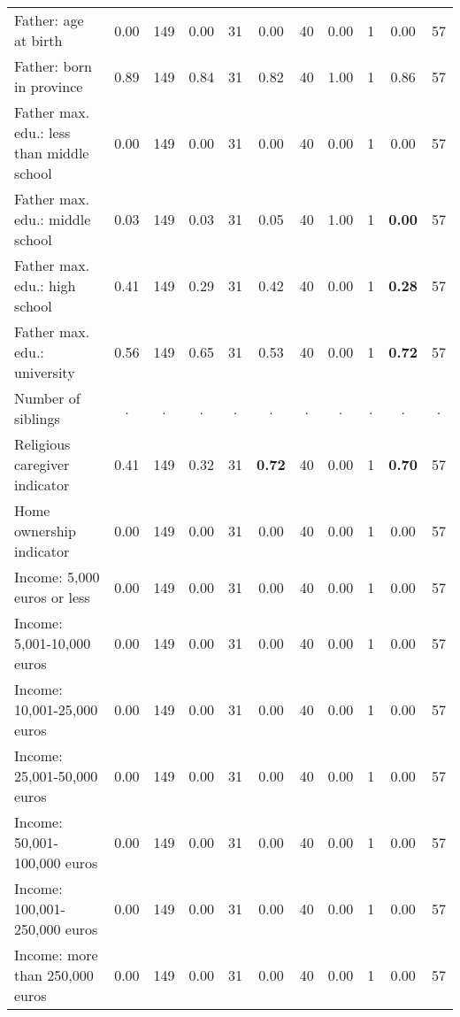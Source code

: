 \begin{tabular}{l c c c c c c c c c c}
Father: age at birth &      0.00 &       149 &      0.00 &        31 &      0.00 &        40 &      0.00 &         1 &      0.00 &        57 \\
Father: born in province &      0.89 &       149 &      0.84 &        31 &      0.82 &        40 &      1.00 &         1 &      0.86 &        57 \\
Father max. edu.: less than middle school &      0.00 &       149 &      0.00 &        31 &      0.00 &        40 &      0.00 &         1 &      0.00 &        57 \\
Father max. edu.: middle school &      0.03 &       149 &      0.03 &        31 &      0.05 &        40 &      1.00 &         1 & \textbf{     0.00} &        57 \\
Father max. edu.: high school &      0.41 &       149 &      0.29 &        31 &      0.42 &        40 &      0.00 &         1 & \textbf{     0.28} &        57 \\
Father max. edu.: university &      0.56 &       149 &      0.65 &        31 &      0.53 &        40 &      0.00 &         1 & \textbf{     0.72} &        57 \\
Number of siblings &         . & . &         . & . &         . & . &         . & . &         . & . \\
Religious caregiver indicator &      0.41 &       149 &      0.32 &        31 & \textbf{     0.72} &        40 &      0.00 &         1 & \textbf{     0.70} &        57 \\
Home ownership indicator &      0.00 &       149 &      0.00 &        31 &      0.00 &        40 &      0.00 &         1 &      0.00 &        57 \\
Income: 5,000 euros or less &      0.00 &       149 &      0.00 &        31 &      0.00 &        40 &      0.00 &         1 &      0.00 &        57 \\
Income: 5,001-10,000 euros &      0.00 &       149 &      0.00 &        31 &      0.00 &        40 &      0.00 &         1 &      0.00 &        57 \\
Income: 10,001-25,000 euros &      0.00 &       149 &      0.00 &        31 &      0.00 &        40 &      0.00 &         1 &      0.00 &        57 \\
Income: 25,001-50,000 euros &      0.00 &       149 &      0.00 &        31 &      0.00 &        40 &      0.00 &         1 &      0.00 &        57 \\
Income: 50,001-100,000 euros &      0.00 &       149 &      0.00 &        31 &      0.00 &        40 &      0.00 &         1 &      0.00 &        57 \\
Income: 100,001-250,000 euros &      0.00 &       149 &      0.00 &        31 &      0.00 &        40 &      0.00 &         1 &      0.00 &        57 \\
Income: more than 250,000 euros &      0.00 &       149 &      0.00 &        31 &      0.00 &        40 &      0.00 &         1 &      0.00 &        57 \\
\bottomrule
\end{tabular}
